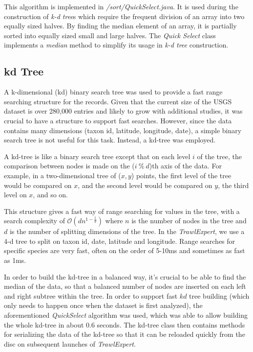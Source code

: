 \documentclass{article}
\begin{document}
This algorithm is implemented in \textit{/sort/QuickSelect.java}. It is used during the construction of \textit{k-d tree}s which require the frequent division of an array into two equally sized halves. By finding the median element of an array, it is partially sorted into equally sized small and large halves. The \textit{Quick Select} class implements a \textit{median} method to simplify its usage in \textit{k-d tree} construction. 


\subsection{kd Tree}
A k-dimensional (kd) binary search tree was used to provide a fast range searching structure for the records. Given that the current size of the USGS dataset is over 280,000 entries and likely to grow with additional studies, it was crucial to have a structure to support fast searches. However, since the data contains many dimensions (taxon id, latitude, longitude, date), a simple binary search tree is not useful for this task. Instead, a kd-tree was employed.

A kd-tree is like a binary search tree except that on each level $i$ of the tree, the comparison between nodes is made on the ($i\ \%\ d$)th axis of the data. For example, in a two-dimensional tree of ($x,y$) points, the first level of the tree would be compared on $x$, and the second level would be compared on $y$, the third level on $x$, and so on.

This structure gives a fast way of range searching for values in the tree, with a search complexity of $\mathcal{O}(dn^{1-\frac{1}{d}})$ where $n$ is the number of nodes in the tree and $d$ is the number of splitting dimensions of the tree. In the \textit{TrawlExpert}, we use a 4-d tree to split on taxon id, date, latitude and longitude. Range searches for specific species are very fast, often on the order of 5-10ms and sometimes as fast as 1ms.

In order to build the kd-tree in a balanced way, it's crucial to be able to find the median of the data, so that a balanced number of nodes are inserted on each left and right subtree within the tree. In order to support fast $kd$ tree building (which only needs to happen once when the dataset is first analyzed), the aforementioned \textit{QuickSelect} algorithm was used, which was able to allow building the whole kd-tree in about 0.6 seconds. The kd-tree class then contains methods for serializing the data of the kd-tree so that it can be reloaded quickly from the disc on subsequent launches of \textit{TrawlExpert}.
\end{document}
